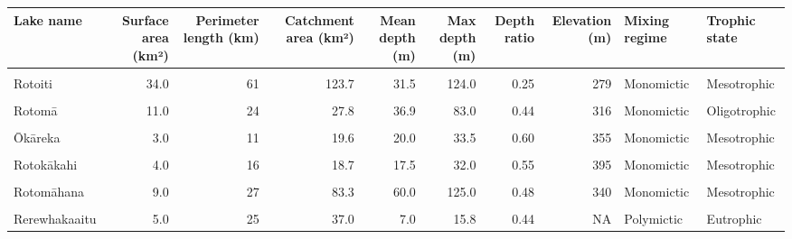 \documentclass[
  letterpaper,
  DIV=11,
  numbers=noendperiod]{scrartcl}
\begin{document}
\begin{longtable}[t]{lrrrrrrrll}
\toprule
Lake name & Surface area (km²) & Perimeter length (km) & Catchment area (km²) & Mean depth (m) & Max depth (m) & Depth ratio & Elevation (m) & Mixing regime & Trophic state\\
\midrule
\cellcolor{gray!8}{Rotorua} & \cellcolor{gray!8}{81.0} & \cellcolor{gray!8}{45} & \cellcolor{gray!8}{508.0} & \cellcolor{gray!8}{11.0} & \cellcolor{gray!8}{45.0} & \cellcolor{gray!8}{0.24} & \cellcolor{gray!8}{280} & \cellcolor{gray!8}{Polymictic} & \cellcolor{gray!8}{Eutrophic}\\
Rotoiti & 34.0 & 61 & 123.7 & 31.5 & 124.0 & 0.25 & 279 & Monomictic & Mesotrophic\\
\cellcolor{gray!8}{Rotoehu} & \cellcolor{gray!8}{8.0} & \cellcolor{gray!8}{40} & \cellcolor{gray!8}{49.2} & \cellcolor{gray!8}{8.0} & \cellcolor{gray!8}{13.5} & \cellcolor{gray!8}{0.59} & \cellcolor{gray!8}{295} & \cellcolor{gray!8}{Polymictic} & \cellcolor{gray!8}{Eutrophic}\\
Rotomā & 11.0 & 24 & 27.8 & 36.9 & 83.0 & 0.44 & 316 & Monomictic & Oligotrophic\\
\cellcolor{gray!8}{Ōkataina} & \cellcolor{gray!8}{11.0} & \cellcolor{gray!8}{29} & \cellcolor{gray!8}{59.8} & \cellcolor{gray!8}{39.4} & \cellcolor{gray!8}{78.5} & \cellcolor{gray!8}{0.50} & \cellcolor{gray!8}{305} & \cellcolor{gray!8}{Monomictic} & \cellcolor{gray!8}{Oligotrophic}\\
\addlinespace
Ōkāreka & 3.0 & 11 & 19.6 & 20.0 & 33.5 & 0.60 & 355 & Monomictic & Mesotrophic\\
\cellcolor{gray!8}{Tikitapu} & \cellcolor{gray!8}{1.0} & \cellcolor{gray!8}{5} & \cellcolor{gray!8}{6.2} & \cellcolor{gray!8}{18.0} & \cellcolor{gray!8}{27.5} & \cellcolor{gray!8}{0.65} & \cellcolor{gray!8}{355} & \cellcolor{gray!8}{Monomictic} & \cellcolor{gray!8}{Oligotrophic}\\
Rotokākahi & 4.0 & 16 & 18.7 & 17.5 & 32.0 & 0.55 & 395 & Monomictic & Mesotrophic\\
\cellcolor{gray!8}{Tarawera} & \cellcolor{gray!8}{41.0} & \cellcolor{gray!8}{48} & \cellcolor{gray!8}{143.1} & \cellcolor{gray!8}{50.0} & \cellcolor{gray!8}{87.5} & \cellcolor{gray!8}{0.57} & \cellcolor{gray!8}{305} & \cellcolor{gray!8}{Monomictic} & \cellcolor{gray!8}{Oligotrophic}\\
Rotomāhana & 9.0 & 27 & 83.3 & 60.0 & 125.0 & 0.48 & 340 & Monomictic & Mesotrophic\\
\addlinespace
\cellcolor{gray!8}{Ōkaro} & \cellcolor{gray!8}{0.3} & \cellcolor{gray!8}{2} & \cellcolor{gray!8}{3.9} & \cellcolor{gray!8}{12.5} & \cellcolor{gray!8}{18.0} & \cellcolor{gray!8}{0.69} & \cellcolor{gray!8}{280} & \cellcolor{gray!8}{Monomictic} & \cellcolor{gray!8}{Eutrophic}\\
Rerewhakaaitu & 5.0 & 25 & 37.0 & 7.0 & 15.8 & 0.44 & NA & Polymictic & Eutrophic\\
\bottomrule

\end{longtable}
\end{document}
